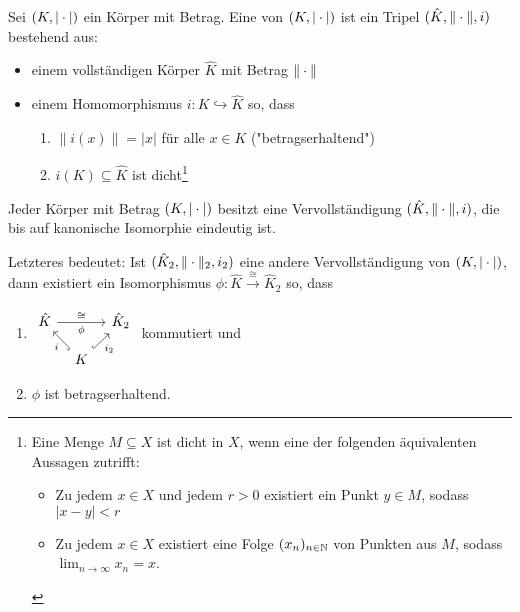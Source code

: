 \documentclass[../main.tex]{subfiles}
\begin{document}
\begin{definition}%
    Sei $(K,|\cdot|)$ ein Körper mit Betrag. Eine  von $(K,|\cdot|)$ ist ein Tripel $(\hat{K},\|\cdot\|,i)$ bestehend aus:
    \begin{itemize}
        \item einem vollständigen Körper $\hat{K}$ mit Betrag $\|\cdot\|$
        \item einem Homomorphismus $i:K \hookrightarrow \hat{K}$ so, dass
        \begin{enumerate}
            \item $\|i(x)\| = |x|$ für alle $x\in K$ ("betragserhaltend")
            \item $i(K)\subseteq \hat{K}$ ist dicht\footnote{
            Eine Menge $M\subseteq X$ ist dicht in $X$, wenn eine der folgenden äquivalenten Aussagen zutrifft:
            \begin{itemize}
                \item Zu jedem $x\in X$ und jedem $r>0$ existiert ein Punkt $y\in M$, sodass $|x-y|<r$
                \item Zu jedem $x\in X$ existiert eine Folge $(x_n)_{n\in\mathbb{N}}$ von Punkten aus $M$, sodass $\lim_{n\rightarrow\infty} x_n = x$.
            \end{itemize}
            }
        \end{enumerate}
    \end{itemize}
\end{definition}

\begin{theorem}
    Jeder Körper mit Betrag $(K,|\cdot|)$ besitzt eine Vervollständigung $(\hat{K}, \|\cdot\|,i)$, die bis auf kanonische Isomorphie eindeutig ist.
\end{theorem}
Letzteres bedeutet:
Ist $(\hat{K}_2, \|\cdot\|_2,i_2)$ eine andere Vervollständigung von $(K,|\cdot|)$, dann existiert ein Isomorphismus $\phi:\hat{K}\overset{\cong}{\rightarrow} \hat{K}_2$ so, dass
\begin{enumerate}[noitemsep]
    \item $%
    \begin{tikzcd}[column sep=0.3cm, row sep=0.4cm]
    \hat{K} \arrow[rr, "\cong", "\phi"'] & & \hat{K}_2 \\
                                & K \arrow[lu, "i", hook] \arrow[ru, "i_2"', hook] &          
    \end{tikzcd}$ kommutiert und
    \item $\phi$ ist betragserhaltend.
\end{enumerate}
\end{document}
